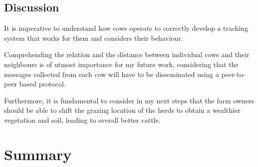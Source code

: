 \subsection{Discussion}
\label{subsec:cow_discussion}
It is imperative to understand how cows operate to correctly develop a tracking system that
works for them and considers their behaviour.

Comprehending the relation and the distance between individual cows and their neighbours is
of utmost importance for my future work, considering that the messages collected from each
cow will have to be disseminated using a peer-to-peer based protocol.

Furthermore, it is fundamental to consider in my next steps that the farm owners should be able
to shift the grazing location of the herds to obtain a wealthier vegetation and soil, leading
to overall better cattle.


\section{Summary}
\label{sec:summary}
